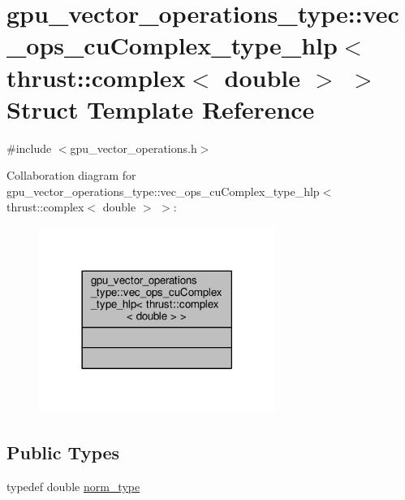\hypertarget{structgpu__vector__operations__type_1_1vec__ops__cuComplex__type__hlp_3_01thrust_1_1complex_3_01double_01_4_01_4}{\section{gpu\-\_\-vector\-\_\-operations\-\_\-type\-:\-:vec\-\_\-ops\-\_\-cu\-Complex\-\_\-type\-\_\-hlp$<$ thrust\-:\-:complex$<$ double $>$ $>$ Struct Template Reference}
\label{structgpu__vector__operations__type_1_1vec__ops__cuComplex__type__hlp_3_01thrust_1_1complex_3_01double_01_4_01_4}
}


{\ttfamily \#include $<$gpu\-\_\-vector\-\_\-operations.\-h$>$}



Collaboration diagram for gpu\-\_\-vector\-\_\-operations\-\_\-type\-:\-:vec\-\_\-ops\-\_\-cu\-Complex\-\_\-type\-\_\-hlp$<$ thrust\-:\-:complex$<$ double $>$ $>$\-:
\nopagebreak
\begin{figure}[H]
\begin{center}
\leavevmode
\includegraphics[width=218pt]{structgpu__vector__operations__type_1_1vec__ops__cuComplex__type__hlp_3_01thrust_1_1complex_3_01double_01_4_01_4__coll__graph}
\end{center}
\end{figure}
\subsection*{Public Types}
\begin{DoxyCompactItemize}
\item 
typedef double \hyperlink{structgpu__vector__operations__type_1_1vec__ops__cuComplex__type__hlp_3_01thrust_1_1complex_3_01double_01_4_01_4_a39900bbd4d214f56f565eba71c33bce0}{norm\-\_\-type}
\end{DoxyCompactItemize}


